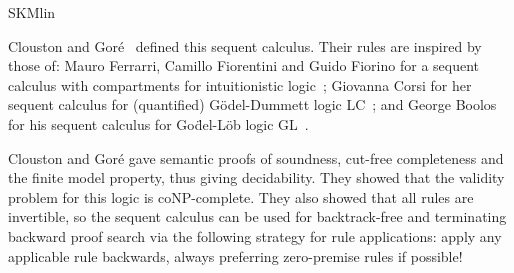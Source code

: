 \begin{entry}{SKMlin}
\begin{history}
Clouston and Gor\'e~\cite{DBLP:conf/fossacs/CloustonG15} defined this
sequent calculus. Their rules are inspired by those of:
Mauro Ferrarri, Camillo Fiorentini and Guido Fiorino for a sequent
calculus with compartments for intuitionistic
logic~\cite{DBLP:journals/jar/FerrariFF13}; Giovanna Corsi for her
sequent calculus for (quantified) G\"odel-Dummett logic
LC~\cite{Corsi89};
and George
Boolos for his sequent calculus for Go\"del-L\"ob logic
GL~\cite{boolos-provability-logic}.

\end{history}

\begin{technicalities}
  Clouston and Gor\'e gave semantic proofs of soundness, cut-free
  completeness and the finite model property, thus giving
  decidability. They showed that the validity problem for this logic
  is coNP-complete. They also showed that all rules are invertible, so
  the sequent calculus can be used for backtrack-free and terminating
  backward proof search via the following strategy for rule
  applications: apply any applicable rule backwards, always preferring
  zero-premise rules if possible!
\end{technicalities}

\end{entry}
